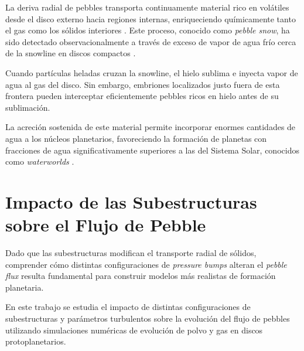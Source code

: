 La deriva radial de pebbles transporta continuamente material rico en volátiles desde el disco externo hacia regiones internas, enriqueciendo químicamente tanto el gas como los sólidos interiores \citep{Booth2017, Booth2019}. Este proceso, conocido como \textit{pebble snow}, ha sido detectado observacionalmente a través de exceso de vapor de agua frío cerca de la snowline en discos compactos \citep{Banzatti2023}.

Cuando partículas heladas cruzan la snowline, el hielo sublima e inyecta vapor de agua al gas del disco. Sin embargo, embriones localizados justo fuera de esta frontera pueden interceptar eficientemente pebbles ricos en hielo antes de su sublimación.

La acreción sostenida de este material permite incorporar enormes cantidades de agua a los núcleos planetarios, favoreciendo la formación de planetas con fracciones de agua significativamente superiores a las del Sistema Solar, conocidos como \textit{waterworlds} \citep{Bitsch2021, McCloat2025, Drazkowska2023}.


\section{Impacto de las Subestructuras sobre el Flujo de Pebble}

Dado que las subestructuras modifican el transporte radial de sólidos, comprender cómo distintas configuraciones de \textit{pressure bumps} alteran el \textit{pebble flux} resulta fundamental para construir modelos más realistas de formación planetaria.

En este trabajo se estudia el impacto de distintas configuraciones de subestructuras y parámetros turbulentos sobre la evolución del flujo de pebbles utilizando simulaciones numéricas de evolución de polvo y gas en discos protoplanetarios.
